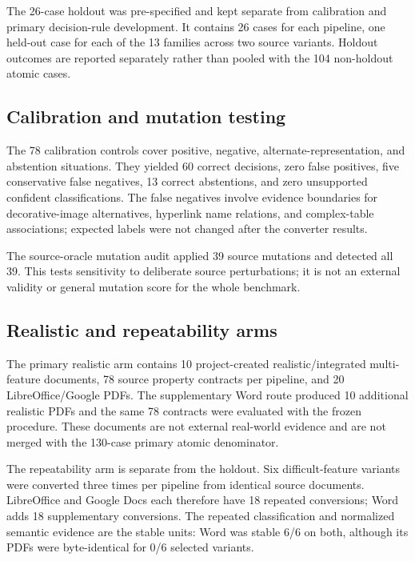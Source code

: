 The 26-case holdout was pre-specified and kept separate from calibration and primary decision-rule development. It contains 26 cases for each pipeline, one held-out case for each of the 13 families across two source variants. Holdout outcomes are reported separately rather than pooled with the 104 non-holdout atomic cases.

\subsection{Calibration and mutation testing}
The 78 calibration controls cover positive, negative, alternate-representation, and abstention situations. They yielded 60 correct decisions, zero false positives, five conservative false negatives, 13 correct abstentions, and zero unsupported confident classifications. The false negatives involve evidence boundaries for decorative-image alternatives, hyperlink name relations, and complex-table associations; expected labels were not changed after the converter results.

The source-oracle mutation audit applied 39 source mutations and detected all 39. This tests sensitivity to deliberate source perturbations; it is not an external validity or general mutation score for the whole benchmark.

\subsection{Realistic and repeatability arms}
The primary realistic arm contains 10 project-created realistic/integrated multi-feature documents, 78 source property contracts per pipeline, and 20 LibreOffice/Google PDFs. The supplementary Word route produced 10 additional realistic PDFs and the same 78 contracts were evaluated with the frozen procedure. These documents are not external real-world evidence and are not merged with the 130-case primary atomic denominator.

The repeatability arm is separate from the holdout. Six difficult-feature variants were converted three times per pipeline from identical source documents. LibreOffice and Google Docs each therefore have 18 repeated conversions; Word adds 18 supplementary conversions. The repeated classification and normalized semantic evidence are the stable units: Word was stable 6/6 on both, although its PDFs were byte-identical for 0/6 selected variants.
